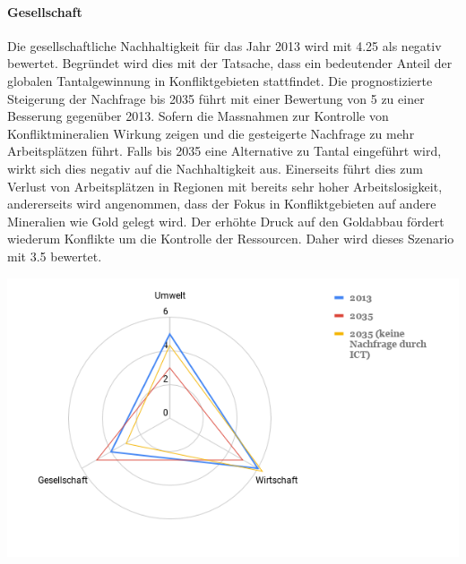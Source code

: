 \paragraph{Gesellschaft}
Die gesellschaftliche Nachhaltigkeit für das Jahr 2013 wird mit 4.25 als negativ
bewertet. Begründet wird dies mit der Tatsache, dass ein bedeutender Anteil der
globalen Tantalgewinnung in Konfliktgebieten stattfindet. Die prognostizierte 
Steigerung der Nachfrage bis 2035 führt mit einer Bewertung von 5 zu einer 
Besserung gegenüber 2013. Sofern die Massnahmen zur Kontrolle von Konfliktmineralien 
Wirkung zeigen und die gesteigerte Nachfrage zu mehr Arbeitsplätzen führt. Falls bis
2035 eine Alternative zu Tantal eingeführt wird, wirkt sich dies negativ auf die 
Nachhaltigkeit aus. Einerseits führt dies zum Verlust von Arbeitsplätzen in Regionen
mit bereits sehr hoher Arbeitslosigkeit, andererseits wird angenommen, dass der 
Fokus in Konfliktgebieten auf andere Mineralien wie Gold gelegt wird. Der erhöhte Druck
auf den Goldabbau fördert wiederum Konflikte um die Kontrolle der Ressourcen. Daher 
wird dieses Szenario mit 3.5 bewertet.


\begin{center}
\includegraphics[width=14cm]{images/tantal-results}
\end{center}
